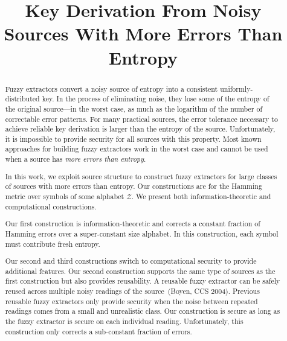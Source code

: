 \documentclass[11pt]{article}
\title{Key Derivation From Noisy Sources With More Errors Than Entropy}
\begin{document}
\maketitle


\begin{abstract}
Fuzzy extractors convert a noisy source of entropy into a consistent uniformly-distributed key.  In the process of eliminating noise, they  lose some of the entropy of the original source---in the worst case, as much as the logarithm of the number of correctable error patterns. For many practical sources, the error tolerance necessary to achieve reliable key derivation is larger than the entropy of the source.  Unfortunately, it is impossible to provide security for all sources with this property.  Most known approaches for building fuzzy extractors work in the worst case and cannot be used when a source has \emph{more errors than entropy}.  

In this work, we exploit source structure to construct fuzzy extractors for large classes of sources with more errors than entropy.  Our constructions are for the Hamming metric over symbols of some alphabet $\mathcal{Z}$.  We present both information-theoretic and computational constructions.

Our first construction is information-theoretic and corrects a constant fraction of Hamming errors over a super-constant size alphabet.  In this construction, each symbol must contribute fresh entropy.  

Our second and third constructions switch to computational security to provide additional features.  Our second construction supports the same type of sources as the first construction but also provides reusability.  A reusable fuzzy extractor can be safely reused across multiple noisy readings of the source~(Boyen, CCS 2004).  Previous reusable fuzzy extractors only provide security when the noise between repeated readings comes from a small and unrealistic class. Our construction is secure as long as the fuzzy extractor is secure on each individual reading. Unfortunately, this construction only corrects a sub-constant fraction of errors.  %


\end{abstract}
\end{document}

